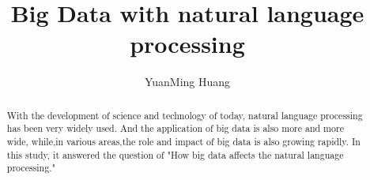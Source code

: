 \documentclass[sigconf]{acmart}
\begin{document}
\title{Big Data with natural language processing}


\author{YuanMing Huang}


\renewcommand{\shortauthors}{G. v. Laszewski}


\begin{abstract}
With the development of science and technology of today, natural language processing has been very widely used. And the application of big data is also more and more wide, while,in various areas,the role and impact of big data is also growing rapidly. In this study, it answered the question of "How big data affects the natural language processing."

\end{abstract}



\maketitle
\end{document}
